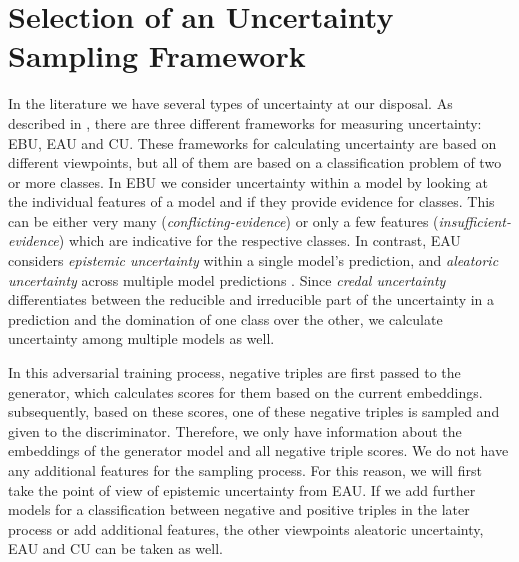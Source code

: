 \section{Selection of an Uncertainty Sampling Framework} 
\label{sec:selection_of_an_uncertainty_sampling_type}

In the literature we have several types of uncertainty at our disposal.
As described in , there are three different frameworks for measuring uncertainty:
\ac{EBU}, \ac{EAU} and \ac{CU}.
These frameworks for calculating uncertainty are based on different viewpoints, but all of them are based on a classification problem of two or more classes.
In \ac{EBU} we consider uncertainty within a model by looking at the individual features of a model and if they provide evidence for classes.
This can be either very many (\textit{conflicting-evidence}) or only a few features (\textit{insufficient-evidence}) which are indicative for the respective classes.
In contrast, \ac{EAU} considers \textit{epistemic uncertainty} within a single model’s prediction, and \textit{aleatoric uncertainty} across multiple model predictions \cite{human-in-the-loop}.
Since \textit{credal uncertainty} differentiates between the reducible and irreducible part of the uncertainty in a prediction and the domination of one class over the other, we calculate uncertainty among multiple models as well.

In this adversarial training process, negative triples are first passed to the generator, which calculates scores for them based on the current embeddings.
subsequently, based on these scores, one of these negative triples is sampled and given to the discriminator.
Therefore, we only have information about the embeddings of the generator model and all negative triple scores.
We do not have any additional features for the sampling process.
For this reason, we will first take the point of view of epistemic uncertainty from \ac{EAU}.
If we add further models for a classification between negative and positive triples in the later process or add additional features, the other viewpoints aleatoric uncertainty, \ac{EAU} and \ac{CU} can be taken as well.






